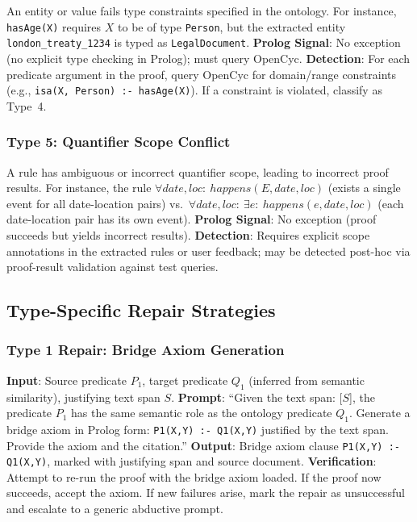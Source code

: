 \documentclass[11pt,letterpaper]{article}
\begin{document}
An entity or value fails type constraints specified in the ontology. For instance, \texttt{hasAge(X)} requires $X$ to be of type \texttt{Person}, but the extracted entity \texttt{london\_treaty\_1234} is typed as \texttt{LegalDocument}. \textbf{Prolog Signal}: No exception (no explicit type checking in Prolog); must query OpenCyc. \textbf{Detection}: For each predicate argument in the proof, query OpenCyc for domain/range constraints (e.g., \texttt{isa(X, Person) :- hasAge(X)}). If a constraint is violated, classify as Type~4.

\subsubsection{Type 5: Quantifier Scope Conflict}

A rule has ambiguous or incorrect quantifier scope, leading to incorrect proof results. For instance, the rule $\forall \mathit{date}, \mathit{loc}{:}\ \mathit{happens}(E, \mathit{date}, \mathit{loc})$ (exists a single event for all date-location pairs) vs.\ $\forall \mathit{date}, \mathit{loc}{:}\ \exists e{:}\ \mathit{happens}(e, \mathit{date}, \mathit{loc})$ (each date-location pair has its own event). \textbf{Prolog Signal}: No exception (proof succeeds but yields incorrect results). \textbf{Detection}: Requires explicit scope annotations in the extracted rules or user feedback; may be detected post-hoc via proof-result validation against test queries.

\subsection{Type-Specific Repair Strategies}

\subsubsection{Type 1 Repair: Bridge Axiom Generation}

\textbf{Input}: Source predicate $P_1$, target predicate $Q_1$ (inferred from semantic similarity), justifying text span $S$.
\textbf{Prompt}: ``Given the text span: [$S$], the predicate $P_1$ has the same semantic role as the ontology predicate $Q_1$. Generate a bridge axiom in Prolog form: \texttt{P1(X,Y) :- Q1(X,Y)} justified by the text span. Provide the axiom and the citation.''
\textbf{Output}: Bridge axiom clause \texttt{P1(X,Y) :- Q1(X,Y)}, marked with justifying span and source document.
\textbf{Verification}: Attempt to re-run the proof with the bridge axiom loaded. If the proof now succeeds, accept the axiom. If new failures arise, mark the repair as unsuccessful and escalate to a generic abductive prompt.
\end{document}
